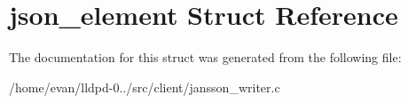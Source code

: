 \section{json\-\_\-element \-Struct \-Reference}
\label{structjson__element}


\-The documentation for this struct was generated from the following file\-:\begin{DoxyCompactItemize}
\item 
/home/evan/lldpd-\/0../src/client/jansson\-\_\-writer.\-c\end{DoxyCompactItemize}

